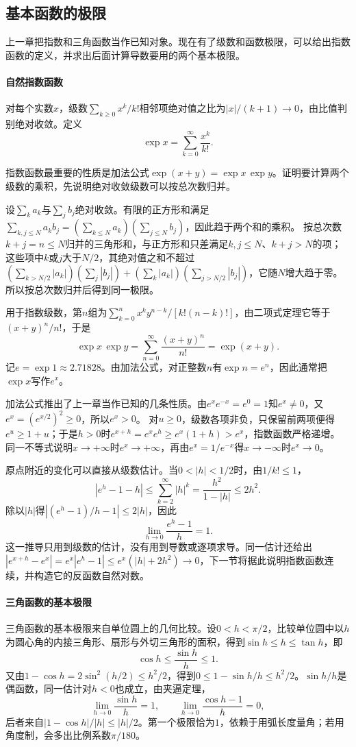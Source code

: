 \subsection{基本函数的极限}
\label{sec:ru-elementary-limits}

上一章把指数和三角函数当作已知对象。现在有了级数和函数极限，可以给出指数函数的定义，并求出后面计算导数要用的两个基本极限。

\paragraph{自然指数函数}
对每个实数$x$，级数$\sum_{k\geq0}x^k/k!$相邻项绝对值之比为$|x|/(k+1)\to0$，由比值判别绝对收敛。定义
\[
 \exp x=\sum_{k=0}^\infty\frac{x^k}{k!}.
\]

指数函数最重要的性质是加法公式$\exp(x+y)=\exp x\,\exp y$。证明要计算两个级数的乘积，先说明绝对收敛级数可以按总次数归并。

设$\sum_ka_k$与$\sum_jb_j$绝对收敛。有限的正方形和满足$\sum_{k,j\leq N}a_kb_j=(\sum_{k\leq N}a_k)(\sum_{j\leq N}b_j)$，因此趋于两个和的乘积。
按总次数$k+j=n\leq N$归并的三角形和，与正方形和只差满足$k,j\leq N$、$k+j>N$的项；这些项中$k$或$j$大于$N/2$，其绝对值之和不超过
$(\sum_{k>N/2}|a_k|)(\sum_j|b_j|)+(\sum_k|a_k|)(\sum_{j>N/2}|b_j|)$，它随$N$增大趋于零。所以按总次数归并后得到同一极限。

用于指数级数，第$n$组为$\sum_{k=0}^nx^ky^{n-k}/[k!(n-k)!]$，由二项式定理它等于$(x+y)^n/n!$，于是
\[
 \exp x\,\exp y=\sum_{n=0}^\infty\frac{(x+y)^n}{n!}=\exp(x+y).
\]
记$e=\exp1\approx2.71828$。由加法公式，对正整数$n$有$\exp n=e^n$，因此通常把$\exp x$写作$e^x$。

加法公式推出了上一章当作已知的几条性质。由$e^xe^{-x}=e^0=1$知$e^x\neq0$，又$e^x=(e^{x/2})^2\geq0$，所以$e^x>0$。
对$u\geq0$，级数各项非负，只保留前两项便得$e^u\geq1+u$；于是$h>0$时$e^{x+h}=e^xe^h\geq e^x(1+h)>e^x$，指数函数严格递增。
同一不等式说明$x\to+\infty$时$e^x\to+\infty$，再由$e^x=1/e^{-x}$得$x\to-\infty$时$e^x\to0$。

原点附近的变化可以直接从级数估计。当$0<|h|<1/2$时，由$1/k!\leq1$，
\[
 |e^h-1-h|\leq\sum_{k=2}^\infty|h|^k=\frac{h^2}{1-|h|}\leq2h^2.
\]
除以$|h|$得$|(e^h-1)/h-1|\leq2|h|$，因此
\[
 \lim_{h\to0}\frac{e^h-1}{h}=1.
\]
这一推导只用到级数的估计，没有用到导数或逐项求导。同一估计还给出$|e^{x+h}-e^x|=e^x|e^h-1|\leq e^x(|h|+2h^2)\to0$，下一节将据此说明指数函数连续，并构造它的反函数自然对数。

\paragraph{三角函数的基本极限}
三角函数的基本极限来自单位圆上的几何比较。设$0<h<\pi/2$，比较单位圆中以$h$为圆心角的内接三角形、扇形与外切三角形的面积，得到$\sin h\leq h\leq\tan h$，即
\[
 \cos h\leq\frac{\sin h}h\leq1.
\]
又由$1-\cos h=2\sin^2(h/2)\leq h^2/2$，得到$0\leq1-\sin h/h\leq h^2/2$。$\sin h/h$是偶函数，同一估计对$h<0$也成立，由夹逼定理，
\[
 \lim_{h\to0}\frac{\sin h}h=1,\qquad\lim_{h\to0}\frac{\cos h-1}h=0,
\]
后者来自$|1-\cos h|/|h|\leq|h|/2$。第一个极限恰为$1$，依赖于用弧长度量角；若用角度制，会多出比例系数$\pi/180$。
